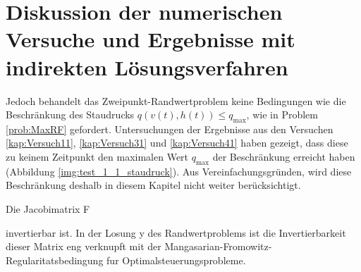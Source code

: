%
%
%
%
%



\section{Diskussion der numerischen Versuche und Ergebnisse mit indirekten Lösungsverfahren}
Jedoch behandelt das Zweipunkt-Randwertproblem keine Bedingungen wie die Beschränkung des Staudrucks $q(v(t),h(t)) \leq q_{\max}$, wie in Problem \ref{prob:MaxRF} gefordert. Untersuchungen der Ergebnisse aus den Versuchen \ref{kap:Versuch11}, \ref{kap:Versuch31} und  \ref{kap:Versuch41} haben gezeigt, dass diese zu keinem Zeitpunkt den maximalen Wert $q_{\max}$ der Beschränkung erreicht haben (Abbildung \ref{img:test_1_1_staudruck}). Aus Vereinfachungsgründen, wird diese Beschränkung deshalb in diesem Kapitel nicht weiter berücksichtigt.




Die Jacobimatrix F

invertierbar ist. In der Losung y des Randwertproblems ist die Invertierbarkeit dieser Matrix eng verknupft mit der Mangasarian-Fromowitz-Regularitatsbedingung
fur Optimalsteuerungsprobleme.
